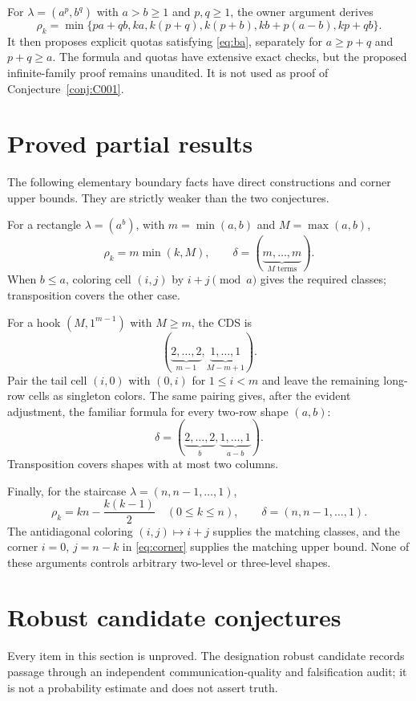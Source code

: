 \documentclass[11pt]{amsart}
\theoremstyle{definition}
\begin{document}
For $\lambda=(a^p,b^q)$ with $a>b\geq1$ and $p,q\geq1$, the owner
argument derives
\begin{equation}
 \rho_k=\min\{pa+qb,ka,k(p+q),k(p+b),kb+p(a-b),kp+qb\}.
 \label{eq:six-line}
\end{equation}
It then proposes explicit quotas satisfying \eqref{eq:ba}, separately for
$a\geq p+q$ and $p+q\geq a$.  The formula and quotas have extensive exact
checks, but the proposed infinite-family proof remains unaudited.  It is not
used as proof of Conjecture~\ref{conj:C001}.

\section{Proved partial results}

The following elementary boundary facts have direct constructions and corner
upper bounds.  They are strictly weaker than the two conjectures.

For a rectangle $\lambda=(a^b)$, with
$m=\min(a,b)$ and $M=\max(a,b)$,
\[
 \rho_k=m\min(k,M),\qquad
 \delta=(\underbrace{m,\ldots,m}_{M\text{ terms}}).
\]
When $b\leq a$, coloring cell $(i,j)$ by $i+j\pmod a$ gives the required
classes; transposition covers the other case.

For a hook $(M,1^{m-1})$ with $M\geq m$, the CDS is
\[
 (\underbrace{2,\ldots,2}_{m-1},
  \underbrace{1,\ldots,1}_{M-m+1}).
\]
Pair the tail cell $(i,0)$ with $(0,i)$ for $1\leq i<m$ and leave the
remaining long-row cells as singleton colors.  The same pairing gives, after
the evident adjustment, the familiar formula for every two-row shape
$(a,b)$:
\[
 \delta=(\underbrace{2,\ldots,2}_{b},
          \underbrace{1,\ldots,1}_{a-b}).
\]
Transposition covers shapes with at most two columns.

Finally, for the staircase $\lambda=(n,n-1,\ldots,1)$,
\[
 \rho_k=kn-\frac{k(k-1)}2\quad(0\leq k\leq n),
 \qquad \delta=(n,n-1,\ldots,1).
\]
The antidiagonal coloring $(i,j)\mapsto i+j$ supplies the matching classes,
and the corner $i=0$, $j=n-k$ in \eqref{eq:corner} supplies the matching
upper bound.  None of these arguments controls arbitrary two-level or
three-level shapes.

\section{Robust candidate conjectures}\label{sec:conjectures}

Every item in this section is unproved.  The designation robust candidate
records passage through an independent communication-quality and
falsification audit; it is not a probability estimate and does not assert
truth.
\end{document}
